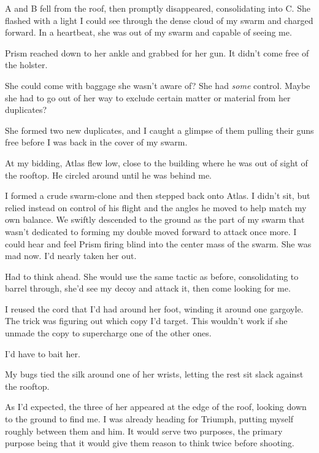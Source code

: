 A and B fell from the roof, then promptly disappeared, consolidating into C.  She flashed with a light I could see through the dense cloud of my swarm and charged forward.  In a heartbeat, she was out of my swarm and capable of seeing me.



Prism reached down to her ankle and grabbed for her gun.  It didn't come free of the holster.



She could come with baggage she wasn't aware of?  She had \emph{some} control.  Maybe she had to go out of her way to exclude certain matter or material from her duplicates?



She formed two new duplicates, and I caught a glimpse of them pulling their guns free before I was back in the cover of my swarm.



At my bidding, Atlas flew low, close to the building where he was out of sight of the rooftop.  He circled around until he was behind me.



I formed a crude swarm-clone and then stepped back onto Atlas.  I didn't sit, but relied instead on control of his flight and the angles he moved to help match my own balance.  We swiftly descended to the ground as the part of my swarm that wasn't dedicated to forming my double moved forward to attack once more.  I could hear and feel Prism firing blind into the center mass of the swarm.  She was mad now.  I'd nearly taken her out.



Had to think ahead.  She would use the same tactic as before, consolidating to barrel through, she'd see my decoy and attack it, then come looking for me.



I reused the cord that I'd had around her foot, winding it around one gargoyle.  The trick was figuring out which copy I'd target.  This wouldn't work if she unmade the copy to supercharge one of the other ones.



I'd have to bait her.



My bugs tied the silk around one of her wrists, letting the rest sit slack against the rooftop.



As I'd expected, the three of her appeared at the edge of the roof, looking down to the ground to find me.  I was already heading for Triumph, putting myself roughly between them and him.  It would serve two purposes, the primary purpose being that it would give them reason to think twice before shooting.




